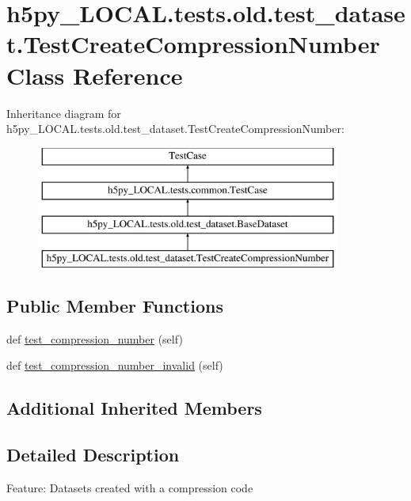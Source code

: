 \hypertarget{classh5py__LOCAL_1_1tests_1_1old_1_1test__dataset_1_1TestCreateCompressionNumber}{}\section{h5py\+\_\+\+L\+O\+C\+A\+L.\+tests.\+old.\+test\+\_\+dataset.\+Test\+Create\+Compression\+Number Class Reference}
\label{classh5py__LOCAL_1_1tests_1_1old_1_1test__dataset_1_1TestCreateCompressionNumber}
Inheritance diagram for h5py\+\_\+\+L\+O\+C\+A\+L.\+tests.\+old.\+test\+\_\+dataset.\+Test\+Create\+Compression\+Number\+:\begin{figure}[H]
\begin{center}
\leavevmode
\includegraphics[height=4.000000cm]{classh5py__LOCAL_1_1tests_1_1old_1_1test__dataset_1_1TestCreateCompressionNumber}
\end{center}
\end{figure}
\subsection*{Public Member Functions}
\begin{DoxyCompactItemize}
\item 
def \hyperlink{classh5py__LOCAL_1_1tests_1_1old_1_1test__dataset_1_1TestCreateCompressionNumber_aff7f9e101bda38fafc744ea941d9b710}{test\+\_\+compression\+\_\+number} (self)
\item 
def \hyperlink{classh5py__LOCAL_1_1tests_1_1old_1_1test__dataset_1_1TestCreateCompressionNumber_ae1c5c6d13189fd047acb75eb0782ac95}{test\+\_\+compression\+\_\+number\+\_\+invalid} (self)
\end{DoxyCompactItemize}
\subsection*{Additional Inherited Members}


\subsection{Detailed Description}
\begin{DoxyVerb}    Feature: Datasets created with a compression code
\end{DoxyVerb}
 

